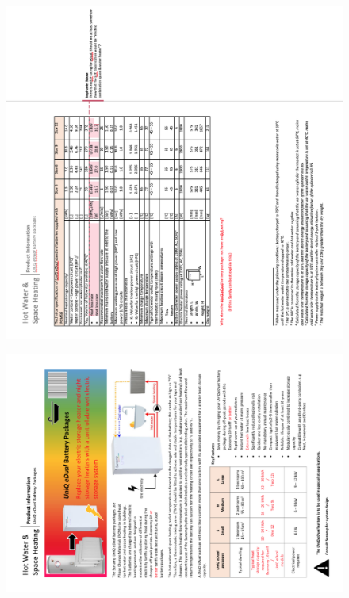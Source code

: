 \newpage
\begin{figure}
	\centering
	\includegraphics[height=0.58\textheight]{Appendices/6_PIS_eDual_02M.png}
\end{figure}

\begin{figure}
	\centering
	\includegraphics[height=0.38\textheight]{Appendices/6_PIS_eDual_01.png}
\end{figure}